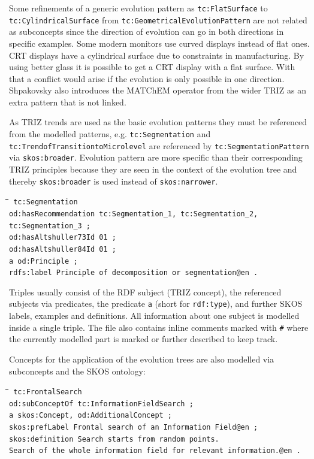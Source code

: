 \documentclass[11pt,a4paper]{article}
\newenvironment{code}{\tt \begin{tabbing}
\hskip12pt\=\hskip12pt\=\hskip12pt\=\hskip12pt\=\hskip5cm\=\hskip5cm\=\kill}
{\end{tabbing}}
\def\dq{{\char34}}
\begin{document}
Some refinements of a generic evolution pattern as \texttt{tc:FlatSurface} to
\texttt{tc:CylindricalSurface} from \texttt{tc:GeometricalEvolutionPattern}
are not related as subconcepts since the direction of evolution can go in both
directions in specific examples. Some modern monitors use curved displays
instead of flat ones. CRT displays have a cylindrical surface due to
constraints in manufacturing. By using better glass it is possible to get a
CRT display with a flat surface. With that a conflict would arise if the
evolution is only possible in one direction. Shpakovsky also introduces the
MATChEM operator from the wider TRIZ as an extra pattern that is not linked.

As TRIZ trends are used as the basic evolution patterns they must be
referenced from the modelled patterns, e.g. \texttt{tc:Segmentation} and
\texttt{tc:TrendofTransitiontoMicrolevel} are referenced by
\texttt{tc:SegmentationPattern} via \texttt{skos:broader}. Evolution pattern
are more specific than their corresponding TRIZ principles because they are
seen in the context of the evolution tree and thereby \texttt{skos:broader} is
used instead of \texttt{skos:narrower}.  

\begin{code}\tt
tc:Segmentation \\
\> od:hasRecommendation tc:Segmentation\_1, tc:Segmentation\_2,\\\>\>
tc:Segmentation\_3 ; \\ 
\> od:hasAltshuller73Id {\dq}01{\dq} ; \\
\> od:hasAltshuller84Id {\dq}01{\dq} ; \\
\> a od:Principle ; \\
\> rdfs:label {\dq}Principle of decomposition or segmentation{\dq}@en .
\end{code}

Triples usually consist of the RDF subject (TRIZ concept), the referenced
subjects via predicates, the predicate \texttt{a} (short for
\texttt{rdf:type}), and further SKOS labels, examples and definitions. All
information about one subject is modelled inside a single triple. The file
also contains inline comments marked with \texttt{\#} where the currently
modelled part is marked or further described to keep track.

Concepts for the application of the evolution trees are also modelled via
subconcepts and the SKOS ontology: 
\begin{code}\tt
tc:FrontalSearch \\
\> od:subConceptOf tc:InformationFieldSearch ; \\
\> a skos:Concept, od:AdditionalConcept ; \\
\> skos:prefLabel {\dq}Frontal search of an Information Field{\dq}@en ; \\
\> skos:definition {\dq}{\dq}{\dq}Search starts from random points. \\
\>\> Search of the whole information field for relevant information.{\dq}{\dq}{\dq}@en .
\end{code}
\end{document}
